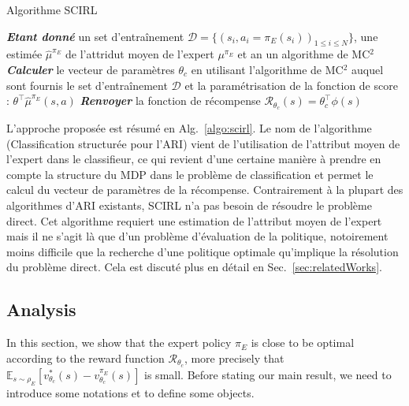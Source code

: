 \documentclass[english,utf8]{./hermes-journal}
\newcommand{\R}{\mathcal{R}}
\newcommand{\D}{\mathcal{D}}
\newcommand{\E}{\mathbb{E}}
\begin{document}
\begin{algorithm2e}%
  \SetAlgoVlined
  \caption{Algorithme SCIRL}
  \label{algo:scirl}
  \BlankLine
  \emph{\textbf{Etant donné}} un set d'entraînement $\D = \{(s_i,a_i=\pi_E(s_i))_{1\leq i\leq N}\}$,
  une estimée $\hat{\mu}^{\pi_E}$ de l'attridut moyen de l'expert $\mu^{\pi_E}$ et an un algorithme de MC$^2$\;
  \BlankLine
  \emph{\textbf{Calculer}} le vecteur de paramètres $\theta_c$ en utilisant l'algorithme de MC$^2$ auquel sont fournis le set d'entraînement $\D$ et la paramétrisation de la fonction de score : $\theta^\top\hat{\mu}^{\pi_E}(s,a)$\;
  \BlankLine
  \emph{\textbf{Renvoyer}} la fonction de récompense $\R_{\theta_c}(s) = \theta_c^\top\phi(s)$ \;
\end{algorithm2e}

L'approche proposée est résumé en Alg.~\ref{algo:scirl}. Le nom de l'algorithme (Classification structurée pour l'ARI) vient de l'utilisation de l'attribut moyen de l'expert dans le classifieur, ce qui revient d'une certaine manière à prendre en compte la structure du MDP dans le problème de classification et permet le calcul du vecteur de paramètres de la récompense. Contrairement à la plupart des algorithmes d'ARI existants, SCIRL n'a pas besoin de résoudre le problème direct. Cet algorithme requiert une estimation de l'attribut moyen de l'expert mais il ne s'agit là que d'un problème d'évaluation de la politique, notoirement moins difficile que la recherche d'une politique optimale qu'implique la résolution du problème direct. Cela est discuté plus en détail en Sec.~\ref{sec:relatedWorks}.
%


\subsection{Analysis}
\label{subsec:scirl:analysis}

In this section, we show that the expert policy $\pi_E$ is close to
be optimal according to the reward function $\R_{\theta_c}$, more
precisely that
$\E_{s\sim\rho_E}[v^*_{\theta_c}(s)-v^{\pi_E}_{\theta_c}(s)]$ is
small. Before stating our main result, we need to introduce some
notations et to define some objects.
\end{document}
